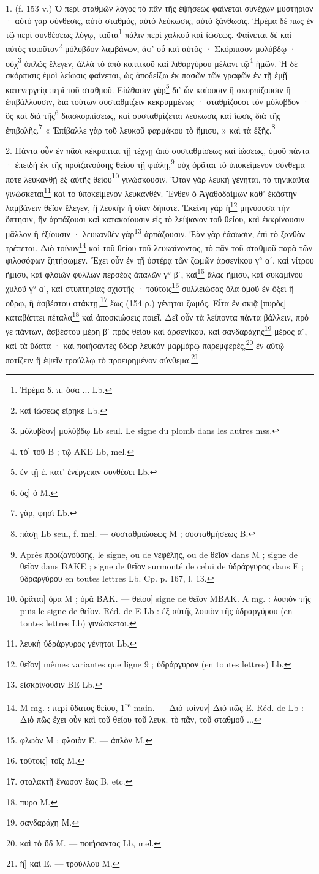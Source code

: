 \documentclass[landscape, a4paper, 11pt, oneside, polutonikogreek, french]{article}
\begin{document}
1. (f. 153 v.) Ὁ περὶ σταθμῶν λόγος τὸ πᾶν τῆς ἑψήσεως φαίνεται συνέχων μυστήριον · αὐτὸ γὰρ σύνθεσις, αὐτὸ σταθμὸς, αὐτὸ λεύκωσις, αὐτὸ ξάνθωσις. Ἠρέμα δέ πως ἐν τῷ περὶ συνθέσεως λόγῳ, ταῦτα\footnote{Ἠρέμα δ. π. ὅσα ... Lb.} πάλιν περὶ χαλκοῦ καὶ ἰώσεως. Φαίνεται δὲ καὶ αὐτὸς τοιοῦτον\footnote{καὶ ἰώσεως εἴρηκε Lb.} μόλυβδον λαμβάνων, ἀφ' οὗ καὶ αὐτὸς · Σκόρπισον μολύβδῳ · οὐχ\footnote{μόλυβδον] μολύβδῳ Lb seul. Le signe du plomb dans les autres mss.} ἁπλῶς ἔλεγεν, ἀλλὰ τὸ ἀπὸ κοπτικοῦ καὶ λιθαργύρου μέλανι τῷ\footnote{τὸ] τοῦ B ; τῷ AKE Lb, mel.} ἡμῶν. Ἡ δὲ σκόρπισις ἐμοὶ λείωσις φαίνεται, ὡς ἀποδείξω ἐκ πασῶν τῶν γραφῶν ἐν τῇ ἐμῇ κατενεργείᾳ περὶ τοῦ σταθμοῦ. Εἰώθασιν γὰρ\footnote{ἐν τῇ ἐ. κατ' ἐνέργειαν συνθέσει Lb.} δι' ὧν καίουσιν ἢ σκορπίζουσιν ἢ ἐπιβάλλουσιν, διὰ τούτων συσταθμίζειν κεκρυμμένως · σταθμίζουσι τὸν μόλυβδον · ὃς καὶ διὰ τῆς\footnote{ὃς] ὁ M.} διασκορπίσεως, καὶ συσταθμίζεται λεύκωσις καὶ ἴωσις διὰ τῆς ἐπιβολῆς.\footnote{γὰρ, φησὶ Lb.} « Ἐπίβαλλε γὰρ τοῦ λευκοῦ φαρμάκου τὸ ἥμισυ, » καὶ τὰ ἑξῆς.\footnote{πάσῃ Lb seul, f. mel. --- συσταθμιώοεως M ; συσταθμήσεως B.}

2. Πάντα οὖν ἐν πᾶσι κέκρυπται τῇ τέχνῃ ἀπὸ συσταθμίσεως καὶ ἰώσεως, ὁμοῦ πάντα · ἐπειδὴ ἐκ τῆς προϊζανούσης θείου τῇ φιάλῃ,\footnote{Après προϊζανούσης, le signe, ou de νεφέλης, ou de θεῖον dans M ; signe de θεῖον dans BAKE ; signe de θεῖον surmonté de celui de ὑδράργυρος dans E ; ὑδραργύρου en toutes lettres Lb. Cp. p. 167, l. 13.} οὐχ ὁρᾶται τὸ ὑποκείμενον σύνθεμα πότε λευκανθῇ ἐξ αὐτῆς θείου\footnote{ὁρᾶται] ὅρα M ; ὁρᾶ BAK. --- θείου] signe de θεῖον MBAK. A mg. : λοιπὸν τῆς puis le signe de θεῖον. Réd. de E Lb : ἐξ αὐτῆς λοιπὸν τῆς ὑδραργύρου (en toutes lettres Lb) γινώσκεται.} γινώσκουσιν. Ὅταν γὰρ λευκὴ γένηται, τὸ τηνικαῦτα γινώσκεται\footnote{λευκὴ ὑδράργυρος γένηται Lb.} καὶ τὸ ὑποκείμενον λευκανθέν. Ἔνθεν ὁ Ἀγαθοδαίμων καθ' ἑκάστην λαμβάνειν θεῖον ἔλεγεν, ἢ λευκὴν ἢ οἵαν δήποτε. Ἐκείνη γὰρ ἡ\footnote{θεῖον] mêmes variantes que ligne 9 ; ὑδράργυρον (en toutes lettres) Lb.} μηνύουσα τὴν ὄπτησιν, ἣν ἁρπάζουσι καὶ κατακαίουσιν εἰς τὸ λείψανον τοῦ θείου, καὶ ἐκκρίνουσιν μᾶλλον ἢ ἐξίουσιν · λευκανθὲν γὰρ\footnote{εἰσκρίνουσιν BE Lb.} ἁρπάζουσιν. Ἐὰν γὰρ ἐάσωσιν, ἐπὶ τὸ ξανθὸν τρέπεται. Διὸ τοίνυν\footnote{M mg. : περὶ ὕδατος θείου, 1\textsuperscript{re} main. --- Διὸ τοίνυν] Διὸ πῶς E. Réd. de Lb : Διὸ πῶς ἔχει οὖν καὶ τοῦ θείου τοῦ λευκ. τὸ πᾶν, τοῦ σταθμοῦ ...} καὶ τοῦ θείου τοῦ λευκαίνοντος, τὸ πᾶν τοῦ σταθμοῦ παρὰ τῶν φιλοσόφων ζητήσωμεν. Ἔχει οὖν ἐν τῇ ὑστέρᾳ τῶν ζωμῶν ἀρσενίκου γ° αʹ, καὶ νίτρου ἥμισυ, καὶ φλοιῶν φύλλων περσέας ἁπαλῶν γ° βʹ, καὶ\footnote{φλωὸν M ; φλοιὸν E. --- ἀπλὸν M.} ἅλας ἥμισυ, καὶ συκαμίνου χυλοῦ γ° αʹ, καὶ στυπτηρίας σχιστῆς · τούτοις\footnote{τούτοις] τοῖς M.} συλλειώσας ὅλα ὁμοῦ ἐν ὄξει ἢ οὔρῳ, ἢ ἀσβέστου στάκτῃ,\footnote{σταλακτῇ ἕνωσον ἕως B, etc.} ἕως (154 ρ.) γένηται ζωμός. Εἶτα ἐν σκιᾷ [πυρὸς] καταβάπτει πέταλα\footnote{πυρο M.} καὶ ἀποσκιώσεις ποιεῖ. Δεῖ οὖν τὰ λείποντα πάντα βάλλειν, πρό γε πάντων, ἀσβέστου μέρη βʹ πρὸς θείου καὶ ἀρσενίκου, καὶ σανδαράχης\footnote{σανδαράχη M.} μέρος αʹ, καὶ τὰ ὕδατα · καὶ ποιήσαντες ὕδωρ λευκὸν μαρμάρῳ παρεμφερὲς,\footnote{καὶ τὸ ὕδ M. --- ποιήσαντας Lb, mel.} ἐν αὐτῷ ποτίζειν ἢ ἑψεῖν τρούλλῳ τὸ προειρημένον σύνθεμα.\footnote{ἢ] καὶ E. --- τρούλλου M.}
\end{document}
